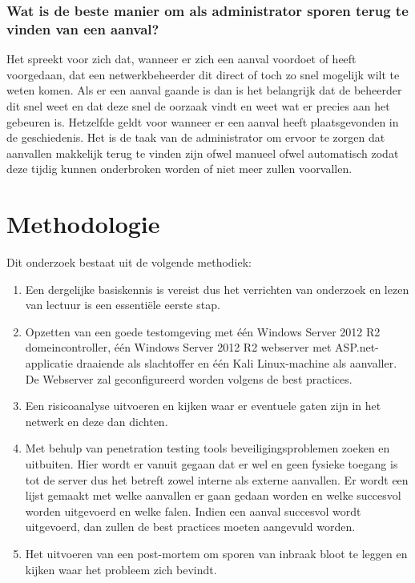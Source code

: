\documentclass[pdftex,a4paper,12pt]{report}
\begin{document}
\subsection{Wat is de beste manier om als administrator sporen terug te vinden van een aanval?}

Het spreekt voor zich dat, wanneer er zich een aanval voordoet of heeft voorgedaan, dat een netwerkbeheerder dit direct of toch zo snel mogelijk wilt te weten komen. Als er een aanval gaande is dan is het belangrijk dat de beheerder dit snel weet en dat deze snel de oorzaak vindt en weet wat er precies aan het gebeuren is. Hetzelfde geldt voor wanneer er een aanval heeft plaatsgevonden in de geschiedenis. Het is de taak van de administrator om ervoor te zorgen dat aanvallen makkelijk terug te vinden zijn ofwel manueel ofwel automatisch zodat deze tijdig kunnen onderbroken worden of niet meer zullen voorvallen.

\chapter{Methodologie}
\label{ch:methodologie}


Dit onderzoek bestaat uit de volgende methodiek:
\begin{enumerate}
	\item Een dergelijke basiskennis is vereist dus het verrichten van onderzoek en lezen van lectuur is een essentiële eerste stap.
	\item Opzetten van een goede testomgeving met één Windows Server 2012 R2 domeincontroller, één Windows Server 2012 R2 webserver met ASP.net-applicatie draaiende als slachtoffer en één Kali Linux-machine als aanvaller. De Webserver zal geconfigureerd worden volgens de best practices.
	\item Een risicoanalyse uitvoeren en kijken waar er eventuele gaten zijn in het netwerk en deze dan dichten. 
	\item Met behulp van penetration testing tools beveiligingsproblemen zoeken en uitbuiten. Hier wordt er vanuit gegaan dat er wel en geen fysieke toegang is tot de server dus het betreft zowel interne als externe aanvallen. Er wordt een lijst gemaakt met welke aanvallen er gaan gedaan worden en welke succesvol worden uitgevoerd en welke falen. Indien een aanval succesvol wordt uitgevoerd, dan zullen de best practices moeten aangevuld worden.
	\item Het uitvoeren van een post-mortem om sporen van inbraak bloot te leggen en kijken waar het probleem zich bevindt.
\end{enumerate}
\end{document}

